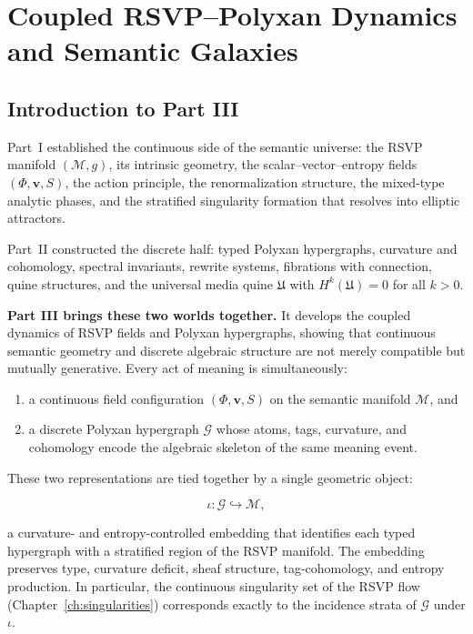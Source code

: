 \documentclass[../../main]{subfiles}
\begin{document}
\part{Coupled RSVP--Polyxan Dynamics and Semantic Galaxies}
\label{part:coupled-dynamics}

\chapter*{Introduction to Part III}

Part~I established the continuous side of the semantic universe:  
the RSVP manifold $(\mathcal{M},g)$, its intrinsic geometry, the
scalar--vector--entropy fields $(\Phi,\mathbf{v},S)$, the action
principle, the renormalization structure, the mixed-type analytic
phases, and the stratified singularity formation that resolves into
elliptic attractors.  

Part~II constructed the discrete half:  
typed Polyxan hypergraphs, curvature and cohomology, spectral invariants,
rewrite systems, fibrations with connection, quine structures, and the
universal media quine $\mathfrak{U}$ with 
$H^k(\mathfrak{U})=0$ for all $k>0$.

\medskip

\noindent
\textbf{Part III brings these two worlds together.}  
It develops the coupled dynamics of RSVP fields and Polyxan hypergraphs,
showing that continuous semantic geometry and discrete algebraic
structure are not merely compatible but mutually generative.  
Every act of meaning is simultaneously:

\begin{enumerate}[label=\textbf{(\alph*)}]
\item a continuous field configuration $(\Phi,\mathbf{v},S)$ on the
      semantic manifold $\mathcal{M}$, and  
\item a discrete Polyxan hypergraph $\mathcal{G}$ whose atoms, tags,
      curvature, and cohomology encode the algebraic skeleton of the
      same meaning event.
\end{enumerate}

\noindent
These two representations are tied together by a single geometric object:

\begin{equation}
\label{eq:embedding}
\iota : \mathcal{G} \hookrightarrow \mathcal{M},
\end{equation}

a curvature- and entropy-controlled embedding that identifies each typed
hypergraph with a stratified region of the RSVP manifold.  
The embedding preserves type, curvature deficit, sheaf structure,
tag-cohomology, and entropy production.  
In particular, the continuous singularity set of the RSVP flow
(Chapter~\ref{ch:singularities}) corresponds exactly to the incidence
strata of $\mathcal{G}$ under $\iota$.
\end{document}
